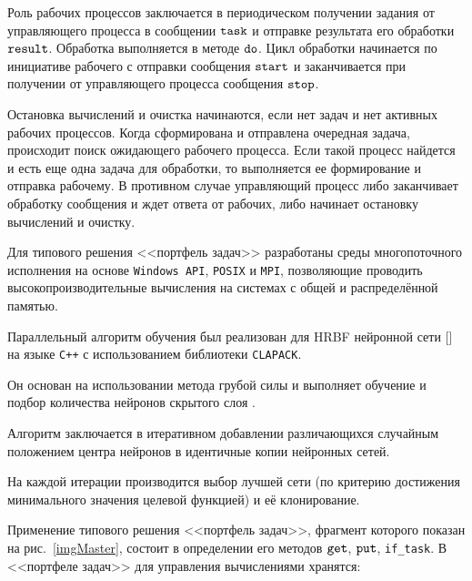 Роль рабочих процессов заключается в периодическом получении задания от управляющего процесса в сообщении $\tt task$ и отправке результата его обработки $\tt result$. Обработка выполняется в методе $\tt do$. Цикл обработки начинается по инициативе рабочего с отправки сообщения $\tt start$ и заканчивается при получении от управляющего процесса сообщения $\tt stop$.



Остановка вычислений и очистка начинаются, если нет задач и нет активных рабочих процессов. Когда сформирована и отправлена очередная задача, происходит поиск ожидающего рабочего процесса. Если такой процесс найдется и есть еще одна задача для обработки, то выполняется ее формирование и отправка рабочему. В противном случае управляющий процесс либо заканчивает обработку сообщения и ждет ответа от рабочих, либо начинает остановку вычислений и очистку.



Для типового решения <<портфель задач>> разработаны среды многопоточного исполнения на основе {\tt Windows API}, {\tt POSIX} и {\tt MPI}, позволяющие проводить высокопроизводительные вычисления на системах с общей и распределённой памятью.





\smallskip




Параллельный алгоритм обучения был реализован для HRBF нейронной сети [] на языке {\tt C++} с использованием библиотеки {\tt CLAPACK}. 

Он основан на использовании метода грубой силы и выполняет обучение и подбор количества нейронов скрытого слоя \cite{Litvinov2010Methods}. 

Алгоритм заключается в итеративном добавлении различающихся случайным положением центра нейронов в идентичные копии нейронных сетей. 

На каждой итерации производится выбор лучшей сети (по критерию достижения минимального значения целевой функцией) и её клонирование. 

Применение типового решения <<портфель задач>>, фрагмент которого показан на рис.~\ref{imgMaster},  состоит в определении его методов $\tt get$, $\tt put$, \verb"if_task". В <<портфеле задач>> для управления вычислениями хранятся:

